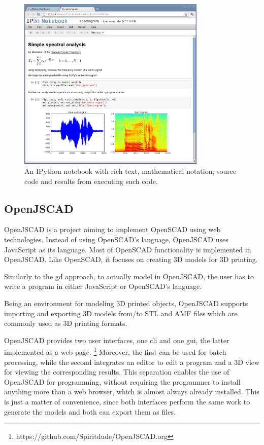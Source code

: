 \begin{figure}
	\centering
	\includegraphics[width=0.8\textwidth]{images/ipython_notebook}
	\caption{An IPython notebook with rich text, mathematical notation, source code and results from executing such code.}
	\label{fig:ipython:notebook}
\end{figure}


\subsection{OpenJSCAD}
OpenJSCAD\cite{openjscad2015site} is a project aiming to implement OpenSCAD\cite{kintel2011openscad} using web technologies.
Instead of using OpenSCAD's language, OpenJSCAD uses JavaScript as its language.
Most of OpenSCAD functionality is implemented in OpenJSCAD.
Like OpenSCAD, it focuses on creating 3D models for 3D printing.

Similarly to the \gls{gd} approach, to actually model in OpenJSCAD, the user has to write a program in either JavaScript or OpenSCAD's language.

Being an environment for modeling 3D printed objects, OpenJSCAD supports importing and exporting 3D models from/to STL and AMF files which are commonly used as 3D printing formats.

OpenJSCAD provides two user interfaces, one \acrfull{cli} and one \acrfull{gui}, the latter implemented as a web page.%
\footnote{https://github.com/Spiritdude/OpenJSCAD.org}
Moreover, the first can be used for batch processing, while the second integrates an editor to edit a program and a 3D view for viewing the corresponding results.
This separation enables the use of OpenJSCAD for programming, without requiring the programmer to install anything more than a web browser, which is almost always already installed.
This is just a matter of convenience, since both interfaces perform the same work to generate the models and both can export them as files.

